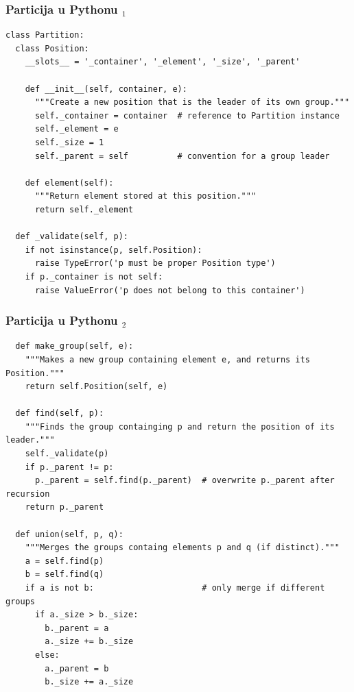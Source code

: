 \documentclass[compress]{beamer}
\begin{document}
\begin{frame}
  \frametitle{Particija u Pythonu $_1$}
\begin{verbatim}
class Partition:
  class Position:
    __slots__ = '_container', '_element', '_size', '_parent'

    def __init__(self, container, e):
      """Create a new position that is the leader of its own group."""
      self._container = container  # reference to Partition instance
      self._element = e
      self._size = 1
      self._parent = self          # convention for a group leader

    def element(self):
      """Return element stored at this position."""
      return self._element

  def _validate(self, p):
    if not isinstance(p, self.Position):
      raise TypeError('p must be proper Position type')
    if p._container is not self:
      raise ValueError('p does not belong to this container')
\end{verbatim}
\end{frame}

\begin{frame}
  \frametitle{Particija u Pythonu $_2$}
\begin{verbatim}
  def make_group(self, e):
    """Makes a new group containing element e, and returns its Position."""
    return self.Position(self, e)

  def find(self, p):
    """Finds the group containging p and return the position of its leader."""
    self._validate(p)
    if p._parent != p:
      p._parent = self.find(p._parent)  # overwrite p._parent after recursion
    return p._parent
    
  def union(self, p, q):
    """Merges the groups containg elements p and q (if distinct)."""
    a = self.find(p)
    b = self.find(q)
    if a is not b:                      # only merge if different groups
      if a._size > b._size:
        b._parent = a
        a._size += b._size
      else:
        a._parent = b
        b._size += a._size
\end{verbatim}
\end{frame}
\end{document}
